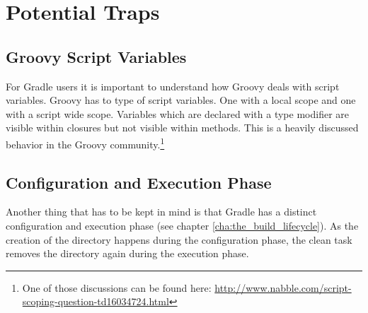 \chapter{Potential Traps} %
\label{cha:potential_traps}
\section{Groovy Script Variables} %
\label{sec:groovy_script_variables}
For Gradle users it is important to understand how Groovy deals with script variables. Groovy has to type of script variables. One with a local scope and one with a script wide scope.
Variables which are declared with a type modifier are visible within closures but not visible within methods. This is a heavily discussed behavior in the Groovy community.\footnote{One of those discussions can be found here: \url{http://www.nabble.com/script-scoping-question-td16034724.html}}

\section{Configuration and Execution Phase} %
\label{sec:configuration_and_execution_phase}
Another thing that has to be kept in mind is that Gradle has a distinct configuration and execution phase (see chapter \ref{cha:the_build_lifecycle}). 
As the creation of the directory happens during the configuration phase, the clean task removes the directory again during the execution phase.

